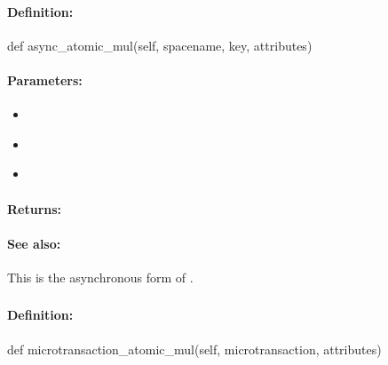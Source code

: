 \paragraph{Definition:}
\begin{pythoncode}
def async_atomic_mul(self, spacename, key, attributes)
\end{pythoncode}

\paragraph{Parameters:}
\begin{itemize}[noitemsep]
\item {}\\

\item {}\\

\item {}\\

\end{itemize}

\paragraph{Returns:}


\paragraph{See also:}  This is the asynchronous form of .

\pagebreak
\subsubsection{}
\label{api:python:microtransaction_atomic_mul}


\paragraph{Definition:}
\begin{pythoncode}
def microtransaction_atomic_mul(self, microtransaction, attributes)
\end{pythoncode}

